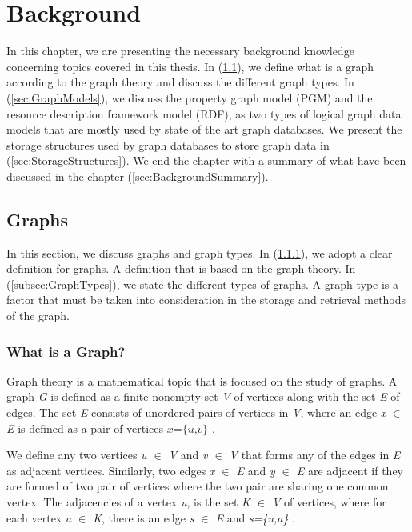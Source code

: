 {\chapter{Background}
\label{chap:Background}

In this chapter, we are presenting the necessary background knowledge concerning topics covered in this thesis. In (\ref{sec:Graphs}), we define what is a graph according to the graph theory and discuss the different graph types. In (\ref{sec:GraphModels}), we discuss the property graph model (PGM) and the resource description framework model (RDF), as two types of logical graph data models that are mostly used by state of the art graph databases. We present the storage structures used by graph databases to store graph data in (\ref{sec:StorageStructures}). We end the chapter with a summary of what have been discussed in the chapter (\ref{sec:BackgroundSummary}).

\section{Graphs}
\label{sec:Graphs}
In this section, we discuss graphs and graph  types. In (\ref{subsec:Graph?}), we adopt a clear definition for graphs. A definition that is based on the graph theory. In (\ref{subsec:GraphTypes}), we state the different types of graphs. A graph type is a factor that must be taken into consideration in the storage and retrieval methods of the graph.

\subsection{What is a Graph?}
\label{subsec:Graph?}
Graph theory is a mathematical topic that is focused on the study of graphs. A graph \textit{G} is defined as a finite nonempty set \textit{V} of vertices along with the set \textit{E} of edges. The set \textit{E} consists of unordered pairs of vertices in \textit{V}, where an edge \textit{x \(\in\) E} is defined as a pair of vertices \(\textit{x=\{u,v\}}\) \cite{harary6graph}.

We define any two vertices \textit{u \(\in\) V} and \textit{v \(\in\) V} that forms any of the edges in \textit{E} as adjacent vertices. Similarly, two edges \textit{x \(\in\) E} and \textit{y \(\in\) E} are adjacent if they are formed of two pair of vertices where the two pair are sharing one common vertex. The adjacencies of a vertex \textit{u}, is the set \textit{K \(\in\) V} of vertices, where for each vertex \textit{a \(\in\) K}, there is an edge \textit{s \(\in\) E} and \textit{s=\{u,a\}} \cite{harary6graph}.

}
